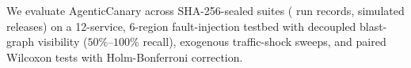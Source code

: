 We evaluate AgenticCanary across \TotalSealedRuns{} SHA-256-sealed suites (\TotalSealedRecords{} run records, \TotalSimReleases{} simulated releases) on a 12-service, 6-region fault-injection testbed with decoupled blast-graph visibility ($50\%$--$100\%$ recall), exogenous traffic-shock sweeps, and paired Wilcoxon tests with Holm-Bonferroni correction.

